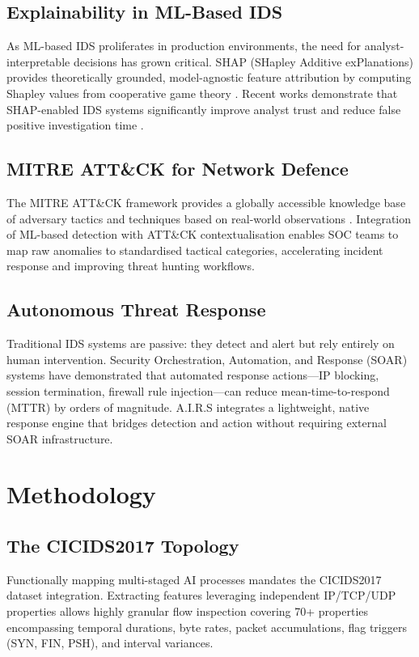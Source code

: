 \documentclass[conference]{IEEEtran}
\begin{document}
\subsection{Explainability in ML-Based IDS}
As ML-based IDS proliferates in production environments, the need for analyst-interpretable decisions has grown critical. SHAP (SHapley Additive exPlanations) provides theoretically grounded, model-agnostic feature attribution by computing Shapley values from cooperative game theory \cite{lundberg2017shap}. Recent works demonstrate that SHAP-enabled IDS systems significantly improve analyst trust and reduce false positive investigation time \cite{mahbooba2021explainable}.

\subsection{MITRE ATT\&CK for Network Defence}
The MITRE ATT\&CK framework provides a globally accessible knowledge base of adversary tactics and techniques based on real-world observations \cite{strom2018mitre}. Integration of ML-based detection with ATT\&CK contextualisation enables SOC teams to map raw anomalies to standardised tactical categories, accelerating incident response and improving threat hunting workflows.

\subsection{Autonomous Threat Response}
Traditional IDS systems are passive: they detect and alert but rely entirely on human intervention. Security Orchestration, Automation, and Response (SOAR) systems \cite{islam2019soar} have demonstrated that automated response actions—IP blocking, session termination, firewall rule injection—can reduce mean-time-to-respond (MTTR) by orders of magnitude. A.I.R.S integrates a lightweight, native response engine that bridges detection and action without requiring external SOAR infrastructure.

\section{Methodology}
\subsection{The CICIDS2017 Topology}
Functionally mapping multi-staged AI processes mandates the CICIDS2017 dataset integration. Extracting features leveraging independent IP/TCP/UDP properties allows highly granular flow inspection covering 70+ properties encompassing temporal durations, byte rates, packet accumulations, flag triggers (SYN, FIN, PSH), and interval variances.
\end{document}
